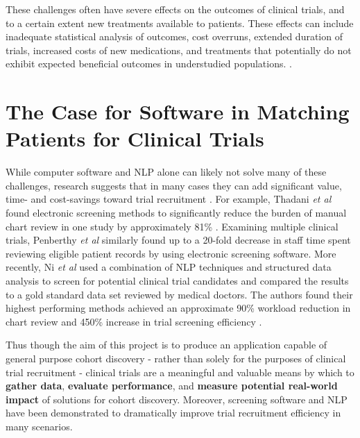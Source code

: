 \documentclass[../main.tex]{subfiles}
\begin{document}
These challenges often have severe effects on the outcomes of clinical trials, and to a certain extent new treatments available to patients. These effects can include inadequate statistical analysis of outcomes, cost overruns, extended duration of trials, increased costs of new medications, and treatments that potentially do not exhibit expected beneficial outcomes in understudied populations. \cite{easterbrook1992fate, penberthy2010automated, mcdonald2006influences, marks2002using}.

\section{The Case for Software in Matching Patients for Clinical Trials}

While computer software and NLP alone can likely not solve many of these challenges, research suggests that in many cases they can add significant value, time- and cost-savings toward trial recruitment \cite{penberthy2010automated, thadani2009electronic}. For example, Thadani \textit{et al} found electronic screening methods to significantly reduce the burden of manual chart review in one study by approximately 81\% \cite{thadani2009electronic}. Examining multiple clinical trials, Penberthy \textit{et al} similarly found up to a 20-fold decrease in staff time spent reviewing eligible patient records by using electronic screening software. More recently, Ni \textit{et al} used a combination of NLP techniques and structured data analysis to screen for potential clinical trial candidates and compared the results to a gold standard data set reviewed by medical doctors. The authors found their highest performing methods achieved an approximate 90\% workload reduction in chart review and 450\% increase in trial screening efficiency \cite{ni2015automated}. 

Thus though the aim of this project is to produce an application capable of general purpose cohort discovery - rather than solely for the purposes of clinical trial recruitment - clinical trials are a meaningful and valuable means by which to \textbf{gather data}, \textbf{evaluate performance}, and \textbf{measure potential real-world impact} of solutions for cohort discovery. Moreover, screening software and NLP have been demonstrated to dramatically improve trial recruitment efficiency in many scenarios.
\end{document}
